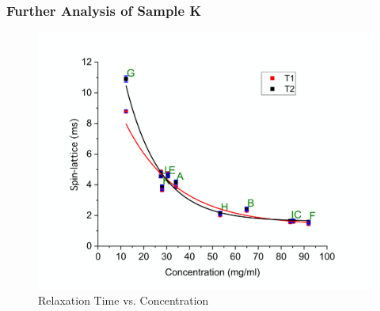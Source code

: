 \begin{frame}
        \frametitle{Further Analysis of Sample K}
        \begin{figure}[htbp!]
            \begin{center}
                \includegraphics[width=0.8\linewidth]{./images/figures/conc_w_k.png}
            \end{center}
                    \caption{Relaxation Time vs. Concentration}
            \label{fig:conc-spin}
        \end{figure}
    \end{frame}

